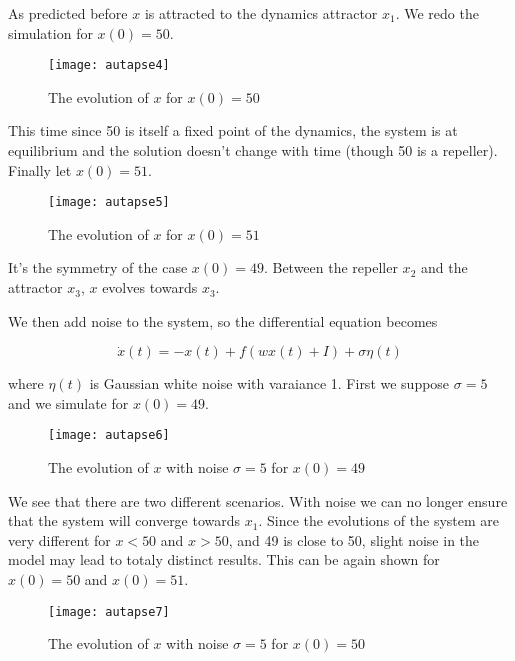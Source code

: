 \noindent
As predicted before $x$ is attracted to the dynamics attractor $x_1$.
We redo the simulation for $x(0) = 50$.

\vspace{-1em}
\begin{figure}[H]
  \centering
  \texttt{[image: autapse4]}
  \caption{The evolution of $x$ for $x(0) = 50$}
\end{figure}

\noindent
This time since 50 is itself a fixed point of the dynamics, the system 
is at equilibrium and the solution doesn't change with time (though 50
is a repeller). Finally let $x(0) = 51$.

\vspace{-1em}
\begin{figure}[H]
  \centering
  \texttt{[image: autapse5]}
  \caption{The evolution of $x$ for $x(0) = 51$}
\end{figure}

\noindent
It's the symmetry of the case $x(0) = 49$. Between the repeller $x_2$ and
the attractor $x_3$, $x$ evolves towards $x_3$.

We then add noise to the system, so the differential equation becomes

\[\dot{x}(t) = -x(t) + f(wx(t)+I) + \sigma\eta(t)\]

\noindent
where $\eta(t)$ is Gaussian white noise with varaiance 1. First we suppose 
$\sigma = 5$ and we simulate for $x(0) = 49$.

\vspace{-1em}
\begin{figure}[H]
  \centering
  \texttt{[image: autapse6]}
  \caption{The evolution of $x$ with noise $\sigma = 5$ for $x(0) = 49$}
\end{figure}

We see that there are two different scenarios. With noise we can no longer
ensure that the system will converge towards $x_1$. Since the evolutions of
the system are very different for $x < 50$ and $x > 50$, and 49 is close
to 50, slight noise in the model may lead to totaly distinct results. This can
be again shown for $x(0) = 50$ and $x(0) = 51$.

\vspace{-1em}
\begin{figure}[H]
  \centering
  \texttt{[image: autapse7]}
  \caption{The evolution of $x$ with noise $\sigma = 5$ for $x(0) = 50$}
\end{figure}

